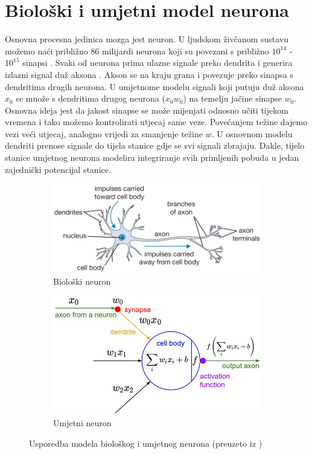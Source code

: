 \documentclass[times, utf8, diplomski]{fer}
\theoremstyle{definition}
\begin{document}
\section{Biološki i umjetni model neurona}
Osnovna procesna jedinica mozga jest neuron. U ljudskom živčanom sustavu možemo naći približno $86$ milijardi neurona koji su povezani s približno $10^{14}$ - $10^{15}$ sinapsi . Svaki od neurona prima ulazne signale preko dendrita  i generira izlazni signal duž aksona . Akson se na kraju grana i povezuje preko sinapsa s dendritima drugih neurona. U umjetnome modelu signali koji putuju duž aksona $x_0$ se množe s dendritima drugog neurona ($x_0w_0$) na temelju jačine sinapse $w_0$. Osnovna ideja jest da jakost sinapse se može mijenjati odnosno učiti tijekom vremena i tako možemo kontrolirati utjecaj same veze. Povećanjem težine dajemo vezi veći utjecaj, analogno vrijedi za smanjenje težine $w$. U osnovnom modelu dendriti prenose signale do tijela stanice gdje se svi signali zbrajaju. Dakle, tijelo stanice umjetnog neurona modelira integriranje svih primljenih pobuda u jedan zajednički potencijal stanice.
\begin{figure}[h]
\centering
\begin{subfigure}{.5\textwidth}
\centering
\includegraphics[width=\linewidth]{neuron.png}
\caption{Biološki neuron}
\label{fig:sub1}
\end{subfigure}%
\begin{subfigure}{.5\textwidth}
\centering
\includegraphics[width=\linewidth]{neuron_model.jpeg}
\caption{Umjetni neuron}
\label{fig:umjetni}
\end{subfigure}
\caption{Usporedba modela biološkog i umjetnog neurona (preuzeto iz \cite{karpathy})}
\label{fig:usporedba_modela}
\end{figure}
\end{document}
